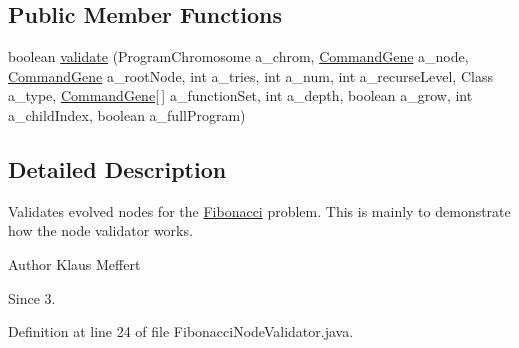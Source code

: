 \subsection*{Public Member Functions}
\begin{DoxyCompactItemize}
\item 
boolean \hyperlink{classexamples_1_1gp_1_1_fibonacci_node_validator_aa9bb65cdf88dc23d9d582caa20cdb039}{validate} (Program\-Chromosome a\-\_\-chrom, \hyperlink{classorg_1_1jgap_1_1gp_1_1_command_gene}{Command\-Gene} a\-\_\-node, \hyperlink{classorg_1_1jgap_1_1gp_1_1_command_gene}{Command\-Gene} a\-\_\-root\-Node, int a\-\_\-tries, int a\-\_\-num, int a\-\_\-recurse\-Level, Class a\-\_\-type, \hyperlink{classorg_1_1jgap_1_1gp_1_1_command_gene}{Command\-Gene}\mbox{[}$\,$\mbox{]} a\-\_\-function\-Set, int a\-\_\-depth, boolean a\-\_\-grow, int a\-\_\-child\-Index, boolean a\-\_\-full\-Program)
\end{DoxyCompactItemize}


\subsection{Detailed Description}
Validates evolved nodes for the \hyperlink{classexamples_1_1gp_1_1_fibonacci}{Fibonacci} problem. This is mainly to demonstrate how the node validator works.

\begin{DoxyAuthor}{Author}
Klaus Meffert 
\end{DoxyAuthor}
\begin{DoxySince}{Since}
3. 
\end{DoxySince}


Definition at line 24 of file Fibonacci\-Node\-Validator.\-java.




